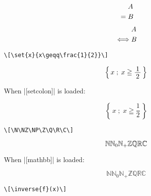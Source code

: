 \documentclass[%
fleqn,%
paper=a4paper,%
fontsize=10pt,%
open_bracket_pos=zenkakunibu_nibu,%
hanging_punctuation,%
]%
{jlreq}
\makeatletter
\DeclareRobustCommand{\linesmash}{\@ifstar{\vspace{-\baselineskip}}{\vspace{-0.25\baselineskip}}}
\makeatother
\begin{document}
\begin{macroexample}
\begin{align*}
&\peq A\\
&=B
\end{align*}
\begin{align*}
&\piff A\\
&\iff B
\end{align*}
\end{macroexample}

\newpage
\begin{lstlisting}
\[\set{x}{x\geqq\frac{1}{2}}\]
\end{lstlisting}

\begin{macroexample}
\linesmash
\[\set{x}{x\geqq\frac{1}{2}}\]
\end{macroexample}

\linesmash\linesmash
\indent\hspace*{0.14\textwidth}When |[setcolon]| is loaded:\\
\begin{macroexample}
\linesmash
\DeclareRobustCommand{\set}[2]{\left\{\,#1\;;\;#2\,\right\}}
\[\set{x}{x\geqq\frac{1}{2}}\]
\end{macroexample}

\begin{lstlisting}
\[\N\NZ\NP\Z\Q\R\C\]
\end{lstlisting}

\begin{macroexample}
\linesmash\linesmash
\[\N\NZ\NP\Z\Q\R\C\]
\end{macroexample}

\linesmash\linesmash
\indent\hspace*{0.14\textwidth}When |[mathbb]| is loaded:\\
\begin{macroexample}
\linesmash\linesmash
\DeclareRobustCommand{\N}{\ensuremath{\mathbb{N}}}
\DeclareRobustCommand{\NZ}{\ensuremath{\mathbb{N}_{0}}}
\DeclareRobustCommand{\NP}{\ensuremath{\mathbb{N}_{+}}}
\DeclareRobustCommand{\Z}{\ensuremath{\mathbb{Z}}}
\DeclareRobustCommand{\Q}{\ensuremath{\mathbb{Q}}}
\DeclareRobustCommand{\R}{\ensuremath{\mathbb{R}}}
\DeclareRobustCommand{\C}{\ensuremath{\mathbb{C}}}
\DeclareRobustCommand{\set}[2]{\left\{\,#1\;;\;#2\,\right\}}
\[\N\NZ\NP\Z\Q\R\C\]
\end{macroexample}

\begin{lstlisting}
\[\inverse{f}(x)\]
\end{lstlisting}
\end{document}
